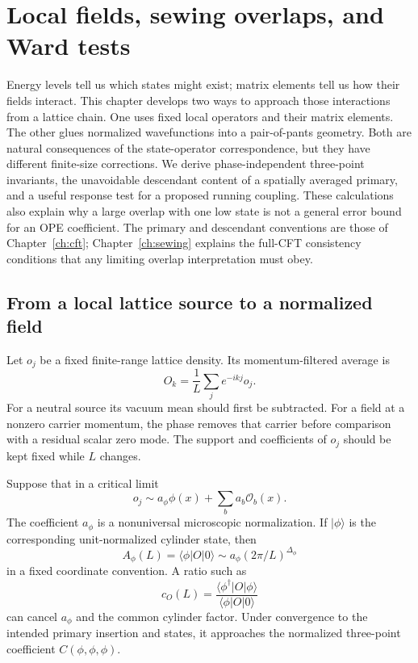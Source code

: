 \chapter{Local fields, sewing overlaps, and Ward tests}
\label{ch:overlaps}

Energy levels tell us which states might exist; matrix elements tell us how
their fields interact. This chapter develops two ways to approach those
interactions from a lattice chain. One uses fixed local operators and their
matrix elements. The other glues normalized wavefunctions into a
pair-of-pants geometry. Both are natural consequences of the state-operator
correspondence, but they have different finite-size corrections. We derive
phase-independent three-point invariants, the unavoidable descendant content
of a spatially averaged primary, and a useful response test for a proposed
running coupling. These calculations also explain why a large overlap with
one low state is not a general error bound for an OPE coefficient.
The primary and descendant conventions are those of
Chapter~\ref{ch:cft}; Chapter~\ref{ch:sewing} explains the full-CFT
consistency conditions that any limiting overlap interpretation must obey.

\section{From a local lattice source to a normalized field}

Let $o_j$ be a fixed finite-range lattice density. Its momentum-filtered
average is
\[
 O_k=\frac1L\sum_j e^{-ikj}o_j.
\]
For a neutral source its vacuum mean should first be subtracted. For a
field at a nonzero carrier momentum, the phase removes that carrier before
comparison with a residual scalar zero mode. The support and coefficients
of $o_j$ should be kept fixed while $L$ changes.

Suppose that in a critical limit
\[
 o_j\sim a_\phi\phi(x)+\sum_ba_b\mathcal O_b(x).
\]
The coefficient $a_\phi$ is a nonuniversal microscopic normalization.
If $|\phi\rangle$ is the corresponding unit-normalized cylinder state,
then
\[
 A_\phi(L)=\langle\phi|O|0\rangle
       \sim a_\phi(2\pi/L)^{\Delta_\phi}
\]
in a fixed coordinate convention. A ratio such as
\begin{equation}
 c_O(L)=\frac{\langle\phi^\dagger|O|\phi\rangle}
                    {\langle\phi|O|0\rangle}
 \label{eq:lattice-cubic}
\end{equation}
can cancel $a_\phi$ and the common cylinder factor. Under convergence to
the intended primary insertion and states, it approaches the normalized
three-point coefficient $C(\phi,\phi,\phi)$.

